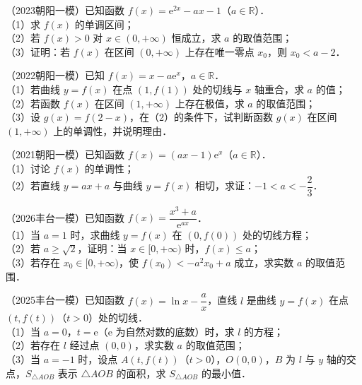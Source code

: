 \begin{example}
（2023朝阳一模）已知函数 $f(x)=\mathrm{e}^{2x}-ax-1$（$a\in\mathbb{R}$）．\\
（1）求 $f(x)$ 的单调区间；\\
（2）若 $f(x)>0$ 对 $x\in(0,+\infty)$ 恒成立，求 $a$ 的取值范围；\\
（3）证明：若 $f(x)$ 在区间 $(0,+\infty)$ 上存在唯一零点 $x_0$，则 $x_0<a-2$．
\end{example}

\begin{example}
（2022朝阳一模）已知 $f(x)=x-a\mathrm{e}^x$，$a\in\mathbb{R}$．\\
（1）若曲线 $y=f(x)$ 在点 $(1,f(1))$ 处的切线与 $x$ 轴重合，求 $a$ 的值；\\
（2）若函数 $f(x)$ 在区间 $(1,+\infty)$ 上存在极值，求 $a$ 的取值范围；\\
（3）设 $g(x)=f(2-x)$，在（2）的条件下，试判断函数 $g(x)$ 在区间 $(1,+\infty)$ 上的单调性，并说明理由．
\end{example}

\begin{example}
（2021朝阳一模）已知函数 $f(x)=(ax-1)\mathrm{e}^x$（$a\in\mathbb{R}$）．\\
（1）讨论 $f(x)$ 的单调性；\\
（2）若直线 $y=ax+a$ 与曲线 $y=f(x)$ 相切，求证：$-1<a<-\dfrac23$．
\end{example}

\begin{example}
（2026丰台一模）已知函数 $f(x)=\dfrac{x^3+a}{\mathrm{e}^{ax}}$．\\
（1）当 $a=1$ 时，求曲线 $y=f(x)$ 在 $(0,f(0))$ 处的切线方程；\\
（2）若 $a\geqslant\sqrt2$，证明：当 $x\in[0,+\infty)$ 时，$f(x)\leqslant a$；\\
（3）若存在 $x_0\in[0,+\infty)$，使 $f(x_0)<-a^2x_0+a$ 成立，求实数 $a$ 的取值范围．
\end{example}

\begin{example}
（2025丰台一模）已知函数 $f(x)=\ln x-\dfrac ax$，直线 $l$ 是曲线 $y=f(x)$ 在点 $(t,f(t))$（$t>0$）处的切线．\\
（1）当 $a=0$，$t=\mathrm{e}$（$\mathrm{e}$ 为自然对数的底数）时，求 $l$ 的方程；\\
（2）若存在 $l$ 经过点 $(0,0)$，求实数 $a$ 的取值范围；\\
（3）当 $a=-1$ 时，设点 $A(t,f(t))$（$t>0$），$O(0,0)$，$B$ 为 $l$ 与 $y$ 轴的交点，$S_{\triangle AOB}$ 表示 $\triangle AOB$ 的面积，求 $S_{\triangle AOB}$ 的最小值．
\end{example}

